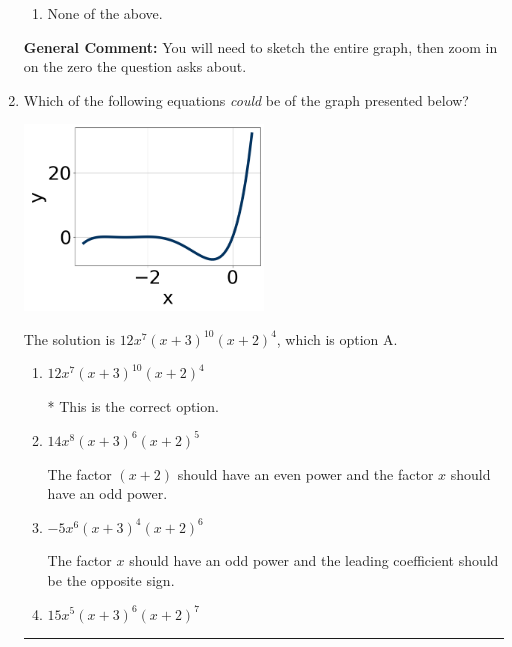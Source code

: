 \documentclass{extbook}[14pt]
\newcommand{\litem}[1]{\item #1

\rule{\textwidth}{0.4pt}}
\begin{document}
\begin{enumerate}
{\begin{enumerate}[label=\Alph*.]
\item None of the above.\end{enumerate}
\textbf{General Comment:} You will need to sketch the entire graph, then zoom in on the zero the question asks about.
}
\litem{
Which of the following equations \textit{could} be of the graph presented below?

\begin{center}
    \includegraphics[width=0.5\textwidth]{../Figures/polyGraphToFunctionCopyC.png}
\end{center}



The solution is \( 12x^{7} (x + 3)^{10} (x + 2)^{4} \), which is option A.\begin{enumerate}[label=\Alph*.]
\item \( 12x^{7} (x + 3)^{10} (x + 2)^{4} \)

* This is the correct option.
\item \( 14x^{8} (x + 3)^{6} (x + 2)^{5} \)

The factor $(x + 2)$ should have an even power and the factor $x$ should have an odd power.
\item \( -5x^{6} (x + 3)^{4} (x + 2)^{6} \)

The factor $x$ should have an odd power and the leading coefficient should be the opposite sign.
\item \( 15x^{5} (x + 3)^{6} (x + 2)^{7} \)


\end{enumerate}}
\end{enumerate}
\end{document}
